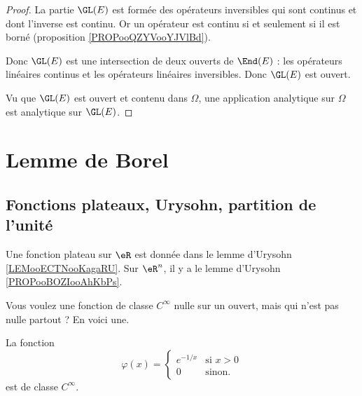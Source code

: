 \begin{proof}
	La partie \( \GL(E)\) est formée des opérateurs inversibles qui sont continus et dont l'inverse est continu. Or un opérateur est continu si et seulement si il est borné (proposition \ref{PROPooQZYVooYJVlBd}).

	Donc \( \GL(E)\) est une intersection de deux ouverts de \( \End(E)\) : les opérateurs linéaires continus et les opérateurs linéaires inversibles. Donc \( \GL(E)\) est ouvert.

	Vu que \( \GL(E)\) est ouvert et contenu dans \( \Omega\), une application analytique sur \( \Omega\) est analytique sur \( \GL(E)\).
\end{proof}


\section{Lemme de Borel}

\subsection{Fonctions plateaux, Urysohn, partition de l'unité}
\label{subsecOSYAooXXCVjv}

Une fonction plateau sur \( \eR\) est donnée dans le lemme d'Urysohn \ref{LEMooECTNooKagaRU}. Sur \( \eR^n\), il y a le lemme d'Urysohn \ref{PROPooBOZIooAhKbPs}.


Vous voulez une fonction de classe \( C^{\infty}\) nulle sur un ouvert, mais qui n'est pas nulle partout ? En voici une.
\begin{lemma}       \label{LEMooFLUSooKaZRRY}
	La fonction
	\begin{equation}
		\varphi(x)=\begin{cases}
			e^{-1/x} & \text{si } x>0 \\
			0        & \text{sinon}.
		\end{cases}
	\end{equation}
	est de classe \(  C^{\infty}\).
\end{lemma}

